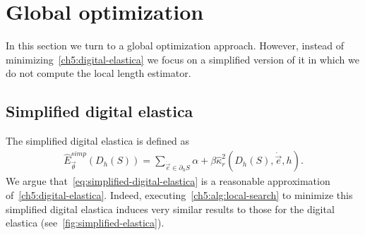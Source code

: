 \section{Global optimization}
\label{ch5:sec:global-optimization}
 In this section we turn to a global optimization approach. However, instead of minimizing~\cref{ch5:digital-elastica} we focus on a simplified version of it in which we do not compute the local length estimator. 

\subsection{Simplified digital elastica}
\label{ch5:subsec:simplified-digital-elastica}

The simplified digital elastica is defined as
	\begin{align}
	\hat{E}_{\vec{\theta}}^{simp}( D_h(S) ) = \sum_{\dot{\vec{e}} \in \partial_h S}{ \alpha + \beta \hat{\kappa}_{r}^2(D_h(S),\dot{\vec{e}},h) }.
	\label{eq:simplified-digital-elastica}
	\end{align}
%	
%
We argue that~\cref{eq:simplified-digital-elastica} is a reasonable approximation of~\cref{ch5:digital-elastica}. Indeed, executing~\cref{ch5:alg:local-search} to minimize this simplified digital elastica induces very similar results to those for the digital elastica (see~\cref{fig:simplified-elastica}).


